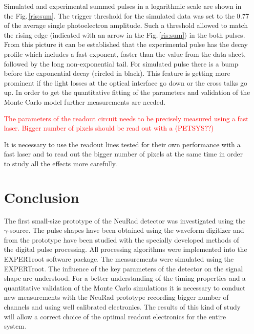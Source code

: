 \documentclass{webofc}
\newcommand{\er}{\textmd{EXPERTroot}}
\newcommand{\red}[1]{\textcolor{red}{#1}}
\begin{document}
Simulated and experimental summed pulses in a logarithmic scale are shown in the Fig.\,\ref{ris:sum}.
The trigger threshold for the simulated data was set to the 0.77 of the average single photoelectron amplitude.
Such a threshold allowed to match the rising edge (indicated with an arrow in the Fig.\,\ref{ris:sum}) in the both pulses. From this picture it can be established that the experimental pulse has the decay profile which includes a fast exponent, faster than the value from the data-sheet, followed by the long non-exponential tail. For simulated pulse there is a bump before the exponential decay (circled in black). This feature is getting more prominent if the light losses at the optical interface go down or the cross talks go up. In order to get the quantitative fitting of the parameters and validation of the Monte Carlo model further measurements are needed. 

\red{The parameters of the readout circuit needs to be precisely measured using a fast laser. Bigger number of pixels should be read out with a (PETSYS??)}

It is necessary to use the readout lines tested for their own performance with a fast laser and to read out the bigger number of pixels at the same time in order to study all the effects more carefully.

\section{Conclusion}
		
	The first small-size prototype of the NeuRad detector was investigated using the $\gamma$-source. The pulse shapes have been obtained using the waveform digitizer and from the prototype have been studied with the specially developed methods of the digital pulse processing. All processing algorithms were implemented into the EXPERTroot software package. The measurements were simulated using the \er. The influence of the key parameters of the detector on the signal shape are understood. For a better understanding of the timing properties and a quantitative validation of the Monte Carlo simulations it is necessary to conduct new measurements with the NeuRad prototype recording bigger number of channels and using well calibrated electronics.
	The results of this kind of study will allow a correct choice of the optimal readout electronics for the entire system.
	
	
\end{document}
